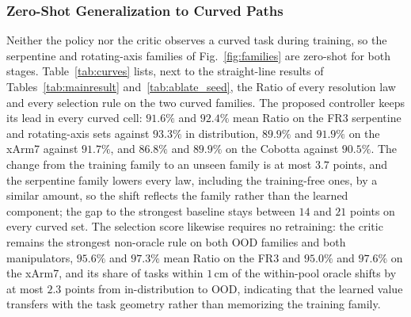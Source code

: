 \documentclass[journal, twoside]{IEEEtran}
\begin{document}
\subsubsection{Zero-Shot Generalization to Curved Paths}
\label{sec:ood}

Neither the policy nor the critic observes a curved task during
training, so the serpentine and rotating-axis families of
Fig.~\ref{fig:families} are zero-shot for both stages.
Table~\ref{tab:curves} lists, next to the straight-line results of
Tables~\ref{tab:mainresult} and~\ref{tab:ablate_seed}, the Ratio of every
resolution law and every selection rule on the two curved families. The
proposed controller keeps its lead in every curved cell: $91.6\%$ and
$92.4\%$ mean Ratio on the FR3 serpentine and rotating-axis sets against
$93.3\%$ in distribution, $89.9\%$ and $91.9\%$ on the xArm7 against
$91.7\%$, and $86.8\%$ and $89.9\%$ on the Cobotta against $90.5\%$. The
change from the training family to an unseen family is at most $3.7$
points, and the serpentine family lowers every law, including the
training-free ones, by a similar amount, so the shift reflects the
family rather than the learned component; the gap to the strongest
baseline stays between $14$ and $21$ points on every curved set. The
selection score likewise requires no retraining: the critic remains the
strongest non-oracle rule on both OOD families and both manipulators,
$95.6\%$ and $97.3\%$ mean Ratio on the FR3 and $95.0\%$ and $97.6\%$ on
the xArm7, and its share of tasks within $1$\,cm of the within-pool
oracle shifts by at most $2.3$ points from in-distribution to OOD,
indicating that the learned value transfers with the task geometry
rather than memorizing the training family.
\end{document}
